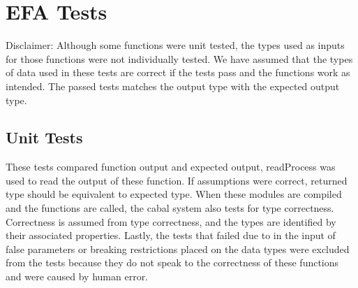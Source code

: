 \documentclass[12pt, svgnames]{article}
\begin{document}
\section{EFA Tests}
Disclaimer: Although some functions were unit tested, the types used as inputs 
for those functions were not individually tested. We have assumed that the 
types of data used in these tests are correct if the tests pass and the 
functions work as intended. The passed tests matches the output type with the 
expected output type.
\subsection{Unit Tests}
These tests compared function output and expected output, readProcess was used 
to read the output of these function. If assumptions were correct, returned 
type should be equivalent to expected type. When these modules are compiled and 
the functions are called, the cabal system also tests for type correctness. 
Correctness is assumed from type correctness, and the types are identified by 
their associated properties. Lastly, the tests that failed due to in the input 
of false parameters or breaking restrictions placed on the data types were 
excluded from the tests because they do not speak to the correctness of these 
functions and were caused by human error.\\
\end{document}
